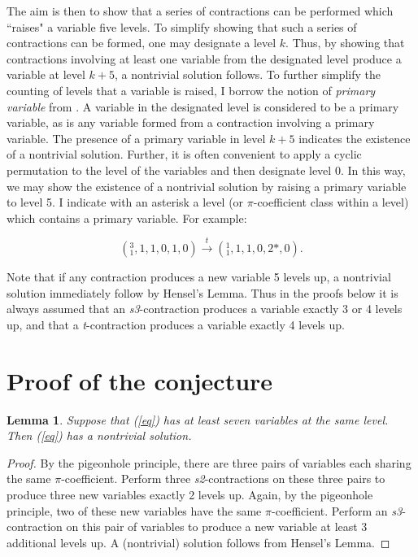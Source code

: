 \documentclass{article}
\newtheorem{lemma}{Lemma}
\begin{document}
The aim is then to show that a series of contractions can be performed which ``raises" a variable five levels.  To simplify showing that such a series of contractions can be formed, one may designate a level $k$.  Thus, by showing that contractions involving at least one variable from the designated level produce a variable at level $k+5$, a nontrivial solution follows.  To further simplify the counting of levels that a variable is raised, I borrow the notion of \textit{primary variable} from \cite{davenport1963homogeneous}.  A variable in the designated level is considered to be a primary variable, as is any variable formed from a contraction involving a primary variable.  The presence of a primary variable in level $k+5$ indicates the existence of a nontrivial solution.  Further, it is often convenient to apply a cyclic permutation to the level of the variables and then designate level 0.  In this way, we may show the existence of a nontrivial solution by raising a primary variable to level 5.  I indicate with an asterisk a level (or $\pi$-coefficient class within a level) which contains a primary variable.  For example:

$$(^3_1, 1, 1, 0, 1, 0) \xrightarrow{t} (^1_1, 1, 1, 0, 2*, 0).$$

Note that if any contraction produces a new variable 5 levels up, a nontrivial solution immediately follow by Hensel's Lemma.  Thus in the proofs below it is always assumed that an \textit{s3}-contraction produces a variable exactly 3 or 4 levels up, and that a \textit{t}-contraction produces a variable exactly 4 levels up.

\section{Proof of the conjecture}

\begin{lemma} \label{max7}
Suppose that (\ref{eq}) has at least seven variables at the same level. Then (\ref{eq}) has a nontrivial solution.
\end{lemma}
\begin{proof}
By the pigeonhole principle, there are three pairs of variables each sharing the same $\pi$-coefficient.  Perform three \textit{s2}-contractions on these three pairs to produce three new variables exactly 2 levels up.  Again, by the pigeonhole principle, two of these new variables have the same $\pi$-coefficient.  Perform an \textit{s3}-contraction on this pair of variables to produce a new variable at least 3 additional levels up.  A (nontrivial) solution follows from Hensel's Lemma.
\end{proof}
\end{document}

